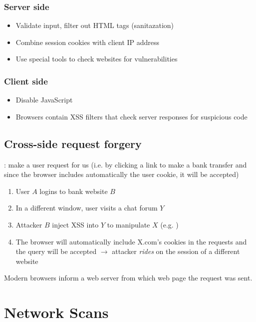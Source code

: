 \subsection{Server side}

\begin{itemize}
    \item Validate input, filter out HTML tags (sanitazation)
    \item Combine session cookies with client IP address
    \item Use special tools to check websites for vulnerabilities
\end{itemize}

\subsection{Client side}

\begin{itemize}
    \item Disable JavaScript
    \item Browsers contain XSS filters that check server responses for suspicious code
\end{itemize}

\section{Cross-side request forgery}

 : make a user request for us (i.e. by clicking a link to make a bank transfer and since the browser includes automatically the user cookie, it will be accepted)

\begin{enumerate}
    \item User $A$ logins to bank website $B$
    \item In a different window, user visits a chat forum $Y$
    \item Attacker $B$ inject XSS into $Y$ to manipulate $X$ (e.g. )
    \item The browser will automatically include X.com's cookies in the requests and the query will be accepted $\rightarrow$ attacker \textit{rides} on the session of a different website
\end{enumerate}

Modern browsers inform a web server from which web page the request was sent.

\chapter{Network Scans}

